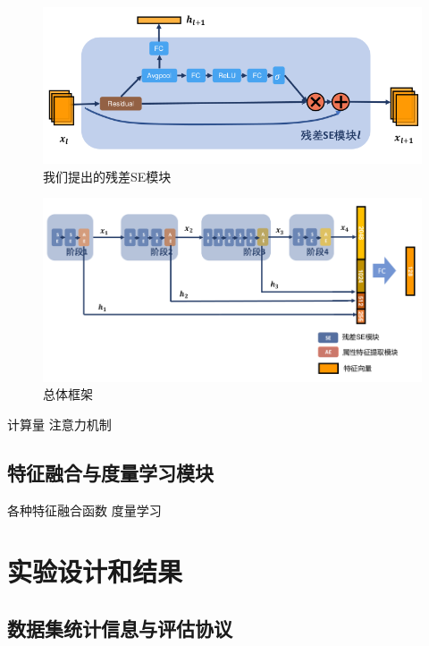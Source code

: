 \begin{figure}
	\centering
	\includegraphics[width=.9\textwidth]{fig/2018-05-11-16-53-10.png}
	\caption{我们提出的残差SE模块}
\end{figure}

\begin{figure}
	\centering
	\includegraphics[width=.9\textwidth]{fig/2018-05-11-16-54-07.png}
	\caption{总体框架}
\end{figure}


计算量
注意力机制

\subsection{特征融合与度量学习模块}

各种特征融合函数
度量学习

\section{实验设计和结果}

\subsection{数据集统计信息与评估协议}

